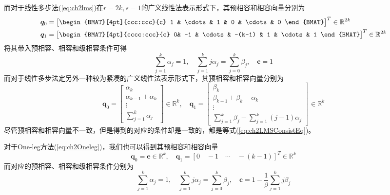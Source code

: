 而对于线性多步法(\ref{eq:ch2lms})在$r=2k,s=1$的广义线性法表示形式下，其预相容和相容向量分别为
\begin{equation}
\begin{aligned}
\bm{q}_0&=\begin{bmatrix}
\begin{BMAT}[4pt]{ccc:ccc}{c}
1 & \cdots & 1 & 0 & \cdots & 0
\end{BMAT}
\end{bmatrix}^T\in\mathbb{R}^{2k}\\
\bm{q}_1&=\begin{bmatrix}
\begin{BMAT}[4pt]{cccc:ccc}{c}
0& -1 & \cdots& -(k-1) & 1 & \cdots & 1
\end{BMAT}
\end{bmatrix}^T\in\mathbb{R}^{2k}
\end{aligned}
\end{equation}
将其带入预相容、相容和级相容条件可得
\begin{equation}
\sum\limits_{j=1}^{k}\alpha_j=1,\quad \sum\limits_{j=1}^{k}j\alpha_j=\sum\limits_{j=0}^{k}\beta_j,\quad\bm{c}=1\label{eq:ch2LMSConsistEq}
\end{equation}
而对于线性多步法定另外一种较为紧凑的广义线性法表示形式下，其预相容和相容向量分别为
\begin{equation}
\bm{q}_0=\begin{bmatrix}
\alpha_k\\
\alpha_{k-1}+\alpha_k\\
\vdots\\
\sum\limits_{j=1}^{k}\alpha_j
\end{bmatrix}\in\mathbb{R}^k,\quad
\bm{q}_1=\begin{bmatrix}
\beta_k\\
\beta_{k-1}+\beta_k-\alpha_k\\
\vdots\\
\sum\limits_{j=1}^{k}\beta_j-\sum\limits_{j=1}^{k}(j-1)\alpha_j
\end{bmatrix}\in\mathbb{R}^k
\end{equation}
尽管预相容和相容向量不一致，但是得到的对应的条件却是一致的，都是等式(\ref{eq:ch2LMSConsistEq})。

对于One-leg方法(\ref{eq:ch2Oneleg})，我们也可以得到其预相容和相容向量
\begin{equation}
\bm{q}_0=\bm{e}\in\mathbb{R}^k,\quad \bm{q}_1=\left[0\quad -1\quad\cdots\quad-(k-1) \right]^T\in\mathbb{R}^k\label{eq:Onelegq0q1}
\end{equation}
而对应的预相容、相容和级相容条件分别为
\begin{equation}
\sum_{j=1}^{k}\alpha_j=1,\quad\sum_{j=1}^{k}j\alpha_j=\sum_{j=0}^{k}\beta_j,\quad\bm{c}=1-\frac{1}{\beta}\sum_{j=1}^{k}j\beta_j
\end{equation}

